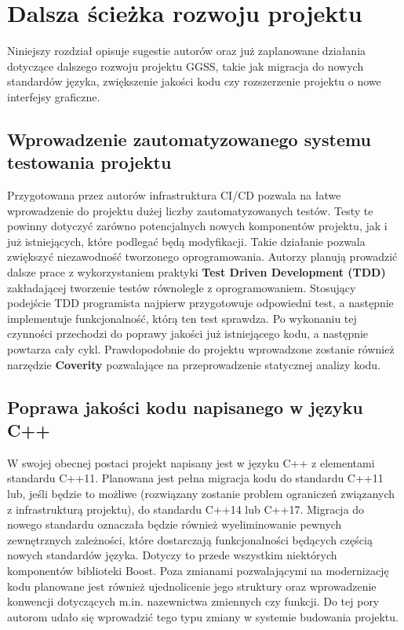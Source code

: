 \chapter{Dalsza ścieżka rozwoju projektu}
\label{cha:dalsze}
Niniejszy rozdział opisuje sugestie autorów oraz już zaplanowane działania dotyczące dalszego rozwoju projektu GGSS, takie jak migracja do nowych standardów języka, zwiększenie jakości kodu czy rozszerzenie projektu o nowe interfejsy graficzne.

\section{Wprowadzenie zautomatyzowanego systemu testowania projektu}
Przygotowana przez autorów infrastruktura CI/CD pozwala na łatwe wprowadzenie do projektu dużej liczby zautomatyzowanych testów. Testy te powinny dotyczyć zarówno potencjalnych nowych komponentów projektu, jak i już istniejących, które podlegać będą modyfikacji. Takie działanie pozwala zwiększyć niezawodność tworzonego oprogramowania. Autorzy planują prowadzić dalsze prace z wykorzystaniem praktyki \textbf{Test Driven Development (TDD)} zakładającej tworzenie testów równolegle z oprogramowaniem. Stosujący podejście TDD programista najpierw przygotowuje odpowiedni test, a następnie implementuje funkcjonalność, którą ten test sprawdza. Po wykonaniu tej czynności przechodzi do poprawy jakości już istniejącego kodu, a następnie powtarza cały cykl. Prawdopodobnie do projektu wprowadzone zostanie również narzędzie \textbf{Coverity} pozwalające na przeprowadzenie statycznej analizy kodu.

\section{Poprawa jakości kodu napisanego w języku C++}
W swojej obecnej postaci projekt napisany jest w języku C++ z elementami standardu C++11. Planowana jest pełna migracja kodu do standardu C++11 lub, jeśli będzie to możliwe (rozwiązany zostanie problem ograniczeń związanych z infrastrukturą projektu), do standardu C++14 lub C++17. Migracja do nowego standardu oznaczała będzie również wyeliminowanie pewnych zewnętrznych zależności, które dostarczają funkcjonalności będących częścią nowych standardów języka. Dotyczy to przede wszystkim niektórych komponentów biblioteki Boost. Poza zmianami pozwalającymi na modernizację kodu planowane jest również ujednolicenie jego struktury oraz wprowadzenie konwencji dotyczących m.in. nazewnictwa zmiennych czy funkcji. Do tej pory autorom udało się wprowadzić tego typu zmiany w systemie budowania projektu. 

